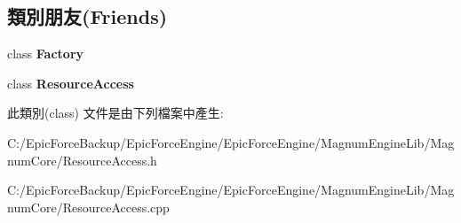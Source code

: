 \subsection*{類別朋友(Friends)}
\begin{DoxyCompactItemize}
\item 
class {\bfseries Factory}\hypertarget{class_magnum_1_1_resource_access_1_1_i_creator_a328c093d609680cca505905c6d49901a}{}\label{class_magnum_1_1_resource_access_1_1_i_creator_a328c093d609680cca505905c6d49901a}

\item 
class {\bfseries Resource\+Access}\hypertarget{class_magnum_1_1_resource_access_1_1_i_creator_a3a26a4a200b91c31f27b5e173018a17c}{}\label{class_magnum_1_1_resource_access_1_1_i_creator_a3a26a4a200b91c31f27b5e173018a17c}

\end{DoxyCompactItemize}


此類別(class) 文件是由下列檔案中產生\+:\begin{DoxyCompactItemize}
\item 
C\+:/\+Epic\+Force\+Backup/\+Epic\+Force\+Engine/\+Epic\+Force\+Engine/\+Magnum\+Engine\+Lib/\+Magnum\+Core/Resource\+Access.\+h\item 
C\+:/\+Epic\+Force\+Backup/\+Epic\+Force\+Engine/\+Epic\+Force\+Engine/\+Magnum\+Engine\+Lib/\+Magnum\+Core/Resource\+Access.\+cpp\end{DoxyCompactItemize}
